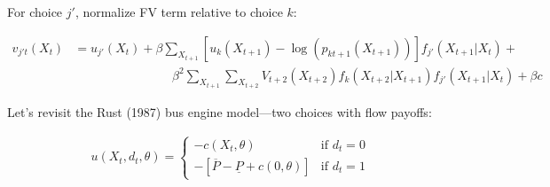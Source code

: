 \documentclass[aspectratio=169]{beamer}
\begin{document}
\begin{frame}

For choice $j'$, normalize FV term relative to choice $k$:

\begin{align*}
v_{j't}(X_{t})&=u_{j'}(X_t)+\beta\sum_{X_{t+1}}\left[u_{k}(X_{t+1})-\log(p_{kt+1}(X_{t+1}))\right]f_{j'}(X_{t+1}|X_t)+\\
&\phantom{==u_{j'}(X_t)+}\beta^2\sum_{X_{t+1}}\sum_{X_{t+2}}V_{t+2}(X_{t+2})f_k(X_{t+2}|X_{t+1})f_{j'}(X_{t+1}|X_t)+\beta c
\end{align*}

\bigskip{}


\end{frame}




\begin{frame}

Let's revisit the Rust (1987) bus engine model---two choices with flow payoffs:

\begin{align*}
u(X_t,d_t,\theta)=\left\{\begin{array}{ll}-c(X_t,\theta)&\text{if }d_t=0\\
-[\overline{P}-\underline{P}+c(0,\theta)]&\text{if } d_t=1\end{array}\right.
\end{align*}

\bigskip{}


\end{frame}
\end{document}
